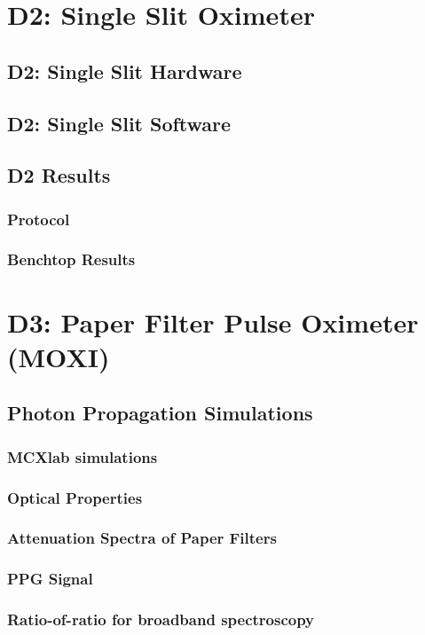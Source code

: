 \section{D2: Single Slit Oximeter}
    \subsection{D2: Single Slit Hardware}
    \subsection{D2: Single Slit Software}
    \subsection{D2 Results}
        \subsubsection{Protocol}
        \subsubsection{Benchtop Results}



\section{D3: Paper Filter Pulse Oximeter (MOXI)}
    \subsection{Photon Propagation Simulations}
        \subsubsection{MCXlab simulations}
        \subsubsection{Optical Properties}
        \subsubsection{Attenuation Spectra of Paper Filters}
        \subsubsection{PPG Signal}
        \subsubsection{Ratio-of-ratio for broadband spectroscopy}
